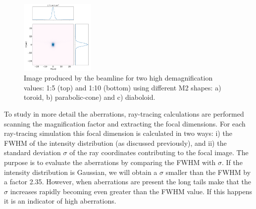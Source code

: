 \documentclass{iucr}              %
\begin{document}
\begin{figure}
\includegraphics[width=0.32\textwidth]{figures/M0p1_diaboloid.png}
\caption{
Image produced by the beamline for two high demagnification values: 1:5 (top) and 1:10 (bottom) using different M2 shapes: a) toroid, b) parabolic-cone) and c) diaboloid.}
\end{figure}


To study in more detail the aberrations, ray-tracing calculations are performed scanning the magnification factor and extracting the focal dimensions. For each ray-tracing simulation this focal dimension is calculated in two ways: i) the FWHM of the intensity distribution (as discussed previously), and ii) the standard deviation $\sigma$ of the ray coordinates contributing to the focal image. The purpose is to evaluate the aberrations by comparing the FWHM with $\sigma$. If the intensity distribution is Gaussian, we will obtain a $\sigma$ smaller than the FWHM by a factor 2.35. However, when aberrations are present the long tails make that the $\sigma$ increases rapidly becoming even greater than the FWHM value. If this happens it is an indicator of high aberrations.  
\end{document}
